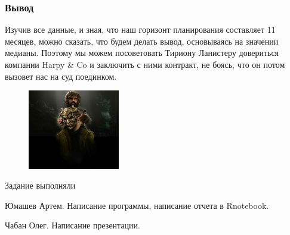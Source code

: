 \documentclass[10pt]{beamer}
\begin{document}
\begin{frame}
\frametitle{Вывод}
Изучив все данные, и зная, что наш горизонт планирования составляет 11 месяцев, можно сказать, что будем делать вывод, основываясь на значении медианы. Поэтому мы можем посоветовать Тириону Ланистеру довериться компании Harpy \& Co и заключить с ними контракт, не боясь, что он потом вызовет нас на суд поединком.
\begin{figure}
\includegraphics[width=40mm]{tirion.jpg}
\end{figure}
\end{frame}

\begin{frame}{Задание выполняли}
	\begin{itemize}
		{\small
		\item Юмашев Артем. Написание программы, написание отчета в Rnotebook.
		\item Чабан Олег. Написание презентации.
		}
	\end{itemize}	

\end{frame}
\end{document}
